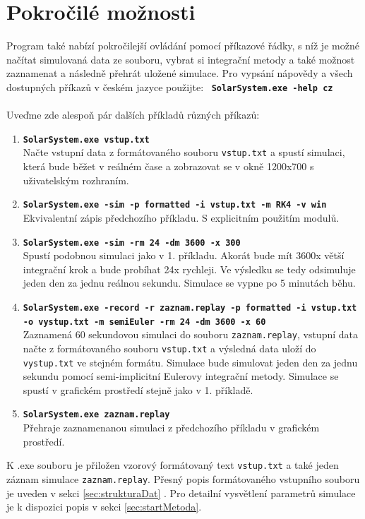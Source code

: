 \section{Pokročilé možnosti}
Program také nabízí pokročilejší ovládání pomocí příkazové řádky, s níž je možné načítat simulovaná data ze souboru, vybrat si integrační metody a také možnost zaznamenat a následně přehrát uložené simulace.
Pro vypsání nápovědy a všech dostupných příkazů v českém jazyce použijte:
\ \texttt{\textbf{SolarSystem.exe -help cz}}
\\\\
Uveďme zde alespoň pár dalších příkladů různých příkazů:
\begin{enumerate}
	\item \texttt{\textbf{SolarSystem.exe vstup.txt}} \\
	Načte vstupní data z formátovaného souboru \texttt{vstup.txt} a spustí simulaci, která bude běžet v reálném čase a zobrazovat se v okně 1200x700 s uživatelským rozhraním.
	\item \texttt{\textbf{SolarSystem.exe -sim -p formatted -i vstup.txt -m RK4 -v win}} \\
	 Ekvivalentní zápis předchozího příkladu. S explicitním použitím modulů.
	\item \texttt{\textbf{SolarSystem.exe -sim -rm 24 -dm 3600 -x 300}} \\
	Spustí podobnou simulaci jako v 1. příkladu. Akorát bude mít 3600x větší integrační krok a bude probíhat 24x rychleji. Ve výsledku se tedy odsimuluje jeden den za jednu reálnou sekundu. Simulace se vypne po 5 minutách běhu.
	\item \texttt{\textbf{SolarSystem.exe -record -r zaznam.replay -p formatted -i vstup.txt -o vystup.txt -m semiEuler -rm 24 -dm 3600 -x 60}}\\
	Zaznamená 60 sekundovou simulaci do souboru \texttt{zaznam.replay}, vstupní data načte z formátovaného souboru \texttt{vstup.txt} a výsledná data uloží do \texttt{vystup.txt} ve stejném formátu. Simulace bude simulovat jeden den za jednu sekundu pomocí semi-implicitní Eulerovy integrační metody. Simulace se spustí v grafickém prostředí stejně jako v 1. příkladě.
	\item  \texttt{\textbf{SolarSystem.exe zaznam.replay}}\\
	Přehraje zaznamenanou simulaci z předchozího příkladu v grafickém prostředí.
\end{enumerate}
K .exe souboru je přiložen vzorový formátovaný text \texttt{vstup.txt} a také jeden záznam simulace \texttt{zaznam.replay}.
Přesný popis formátovaného vstupního souboru je uveden v sekci \ref{sec:strukturaDat} . Pro detailní vysvětlení parametrů simulace je k dispozici popis v sekci \ref{sec:startMetoda}.

